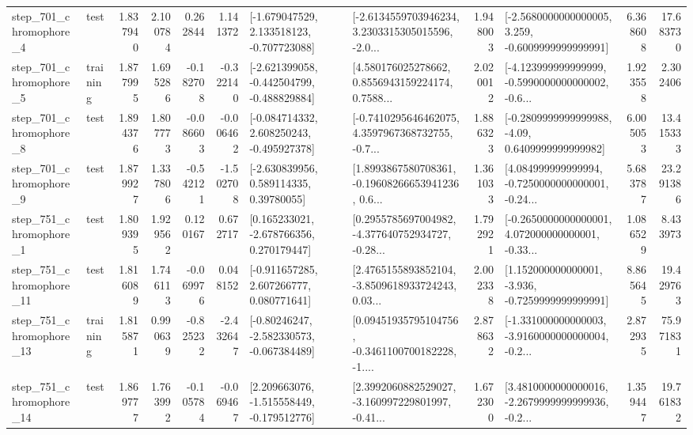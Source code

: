 \begin{tabular}{llrrrrllrlrr}
   step\_701\_chromophore\_4 &      test &      1.837940 &    2.100784 &      0.262844 &  1.141372 &   [-1.679047529, 2.133518123, -0.707723088] &  [-2.6134559703946234, 3.2303315305015596, -2.0... &       1.948003 &  [-2.5680000000000005, 3.259, -0.6009999999999991] &            6.368608 &         17.683730 \\
   step\_701\_chromophore\_5 &  training &      1.877995 &    1.695286 &     -0.182708 & -0.322140 &  [-2.621399058, -0.442504799, -0.488829884] &  [4.580176025278662, 0.8556943159224174, 0.7588... &       2.020012 &  [-4.123999999999999, -0.5990000000000002, -0.6... &            1.923558 &          2.302406 \\
   step\_701\_chromophore\_8 &      test &      1.894376 &    1.807773 &     -0.086603 & -0.006462 &   [-0.084714332, 2.608250243, -0.495927378] &  [-0.7410295646462075, 4.3597967368732755, -0.7... &       1.886323 &   [-0.2809999999999988, -4.09, 0.6409999999999982] &            6.005053 &         13.415333 \\
   step\_701\_chromophore\_9 &      test &      1.879927 &    1.337806 &     -0.542121 & -1.502708 &     [-2.630839956, 0.589114335, 0.39780055] &  [1.8993867580708361, -0.19608266653941236, 0.6... &       1.361033 &  [4.084999999999994, -0.7250000000000001, -0.24... &            5.683787 &         23.291386 \\
   step\_751\_chromophore\_1 &      test &      1.809395 &    1.929562 &      0.120167 &  0.672717 &    [0.165233021, -2.678766356, 0.270179447] &  [0.2955785697004982, -4.377640752934727, -0.28... &       1.792921 &  [-0.2650000000000001, 4.072000000000001, -0.33... &            1.086529 &          8.433973 \\
  step\_751\_chromophore\_11 &      test &      1.816089 &    1.746113 &     -0.069976 &  0.048152 &    [-0.911657285, 2.607266777, 0.080771641] &  [2.4765155893852104, -3.8509618933724243, 0.03... &       2.002338 &   [1.152000000000001, -3.936, -0.7259999999999991] &            8.865645 &         19.429763 \\
  step\_751\_chromophore\_13 &  training &      1.815871 &    0.990639 &     -0.825232 & -2.432647 &   [-0.80246247, -2.582330573, -0.067384489] &  [0.09451935795104756, -0.3461100700182228, -1.... &       2.878632 &  [-1.331000000000003, -3.9160000000000004, -0.2... &            2.872935 &         75.971831 \\
  step\_751\_chromophore\_14 &      test &      1.869777 &    1.763992 &     -0.105784 & -0.069467 &   [2.209663076, -1.515558449, -0.179512776] &  [2.3992060882529027, -3.160997229801997, -0.41... &       1.672300 &  [3.4810000000000016, -2.2679999999999936, -0.2... &            1.359447 &         19.761832 \\

\end{tabular}
